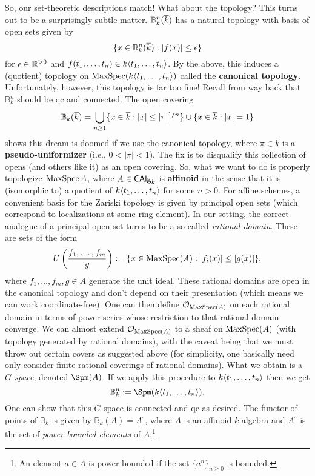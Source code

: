 \documentclass[11pt]{article}
\newcommand{\B}{\mathbb{B}}
\begin{document}
So, our set-theoretic descriptions match! What about the topology? This turns out to be a surprisingly subtle matter. $\B_k^n(\ov{k})$ has a natural topology with basis of open sets given by 
$$\{x\in\B_k^n(\ov{k}) : |f(x)|\leq\eps\}$$
for $\epsilon\in\mathbb{R}^{>0}$ and $f(t_1,\ldots,t_n)\in k\!\left\langle t_1,\ldots,t_n\right\rangle$. By the above, this induces a (quotient) topology on $\operatorname{MaxSpec}(k\!\left\langle t_1,\ldots,t_n\right\rangle)$ called the \textbf{canonical topology}. Unfortunately, however, this topology is far too fine! Recall from way back that $\B_k^n$ should be qc and connected. The open covering
$$\B_k(\ov{k})=\bigcup_{n\geq1}\{x\in\ov{k} : |x|\leq|\pi|^{1/n}\}\cup\{x\in\ov{k} : |x|=1\}$$
shows this dream is doomed if we use the canonical topology, where $\pi\in k$ is a \textbf{pseudo-uniformizer} (i.e., $0<|\pi|<1$). The fix is to disqualify this collection of opens (and others like it) as an open covering. So, what we want to do is properly topologize $\operatorname{MaxSpec} A$, where $A\in\operatorname{\mathsf{CAlg}}_k$ is \textbf{affinoid} in the sense that it is (isomorphic to) a quotient of $k\!\left\langle t_1,\ldots,t_n\right\rangle$ for some $n>0$. For affine schemes, a convenient basis for the Zariski topology is given by principal open sets (which correspond to localizations at some ring element). In our setting, the correct analogue of a principal open set turns to be a so-called \emph{rational domain}. These are sets of the form 
$$U\left(\dfrac{f_1,\ldots,f_m}{g}\right):=\{x\in\operatorname{MaxSpec}(A) : |f_i(x)|\leq|g(x)|\},$$
where $f_1,\ldots,f_m,g\in A$ generate the unit ideal. These rational domains are open in the canonical topology and don't depend on their presentation (which means we can work coordinate-free). One can then define $\mathcal{O}_{\operatorname{MaxSpec}(A)}$ on each rational domain in terms of power series whose restriction to that rational domain converge. We can almost extend $\mathcal{O}_{\operatorname{MaxSpec}(A)}$ to a sheaf on $\operatorname{MaxSpec}(A)$ (with topology generated by rational domains), with the caveat being that we must throw out certain covers as suggested above (for simplicity, one basically need only consider finite rational coverings of rational domains). What we obtain is a \emph{$G$-space}, denoted $\Spm(A)$. If we apply this procedure to $k\!\left\langle t_1,\ldots,t_n\right\rangle$ then we get 
$$\B_k^n:=\Spm(k\ip{t_1,\ldots,t_n}).$$
One can show that this $G$-space is connected and qc as desired. The functor-of-points of $\B_k$ is given by $\B_k(A)=A^{\circ}$, where $A$ is an affinoid $k$-algebra and $A^{\circ}$ is the set of \emph{power-bounded elements} of $A$.\footnote{An element $a\in A$ is power-bounded if the set $\{a^n\}_{n\geq0}$ is bounded.}
\end{document}
